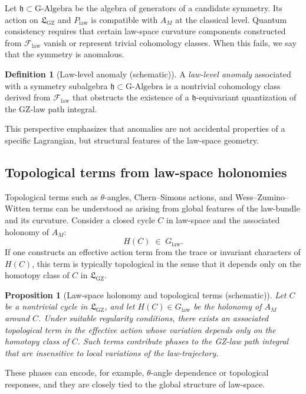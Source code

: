 \documentclass[11pt]{book}
\newcommand{\GAlgebra}{\text{G-Algebra}}
\newcommand{\GZLS}{\ensuremath{\mathfrak{L}_{\mathrm{GZ}}}}
\newcommand{\GZLOC}{\ensuremath{A_M}}
\newcommand{\GZLCurv}{\ensuremath{\mathcal{F}_{\mathrm{law}}}}
\newcommand{\Bundle}{\ensuremath{P}}
\theoremstyle{plain}
\newtheorem{proposition}[theorem]{Proposition}
\theoremstyle{definition}
\newtheorem{definition}[theorem]{Definition}
\theoremstyle{remark}
\begin{document}
Let $\mathfrak{h} \subset \GAlgebra$ be the algebra of generators of a
candidate symmetry. Its action on $\GZLS$ and $\Bundle_{\mathrm{law}}$
is compatible with $\GZLOC$ at the classical level. Quantum
consistency requires that certain law-space curvature components
constructed from $\GZLCurv$ vanish or represent trivial cohomology
classes. When this fails, we say that the symmetry is anomalous.

\begin{definition}[Law-level anomaly (schematic)]
  A \emph{law-level anomaly} associated with a symmetry subalgebra
  $\mathfrak{h} \subset \GAlgebra$ is a nontrivial cohomology class
  derived from $\GZLCurv$ that obstructs the existence of a
  $\mathfrak{h}$-equivariant quantization of the GZ-law path integral.
\end{definition}

This perspective emphasizes that anomalies are not accidental
properties of a specific Lagrangian, but structural features of the
law-space geometry.

\subsection{Topological terms from law-space holonomies}

Topological terms such as $\theta$-angles, Chern--Simons actions, and
Wess--Zumino--Witten terms can be understood as arising from global
features of the law-bundle and its curvature. Consider a closed cycle
$C$ in law-space and the associated holonomy of $\GZLOC$:
\[
   H(C) \;\in\; G_{\mathrm{law}}.
\]
If one constructs an effective action term from the trace or invariant
characters of $H(C)$, this term is typically topological in the sense
that it depends only on the homotopy class of $C$ in $\GZLS$.

\begin{proposition}[Law-space holonomy and topological terms (schematic)]
  Let $C$ be a nontrivial cycle in $\GZLS$, and let
  $H(C) \in G_{\mathrm{law}}$ be the holonomy of $\GZLOC$ around $C$.
  Under suitable regularity conditions, there exists an associated
  topological term in the effective action whose variation depends
  only on the homotopy class of $C$. Such terms contribute phases to
  the GZ-law path integral that are insensitive to local variations
  of the law-trajectory.
\end{proposition}

These phases can encode, for example, $\theta$-angle dependence or
topological responses, and they are closely tied to the global
structure of law-space.
\end{document}

